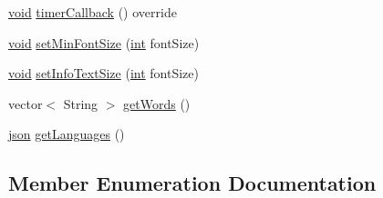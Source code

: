 \begin{DoxyCompactItemize}
\item 
\hyperlink{tk_8h_aba408b7cd755a96426e004c015f5de8e}{void} \hyperlink{class_audealize_1_1_word_map_a397c4fe25b04fc5cdd68032dfb3a07a2}{timer\+Callback} () override
\item 
\hyperlink{tk_8h_aba408b7cd755a96426e004c015f5de8e}{void} \hyperlink{class_audealize_1_1_word_map_aa21c7e96d2e61e77f8360d22b1d3cc0a}{set\+Min\+Font\+Size} (\hyperlink{tk_8h_a83f82f76e7fed06f4c49d2db94028a6d}{int} font\+Size)
\item 
\hyperlink{tk_8h_aba408b7cd755a96426e004c015f5de8e}{void} \hyperlink{class_audealize_1_1_word_map_aaac54963b7da5eb54623597b6585d717}{set\+Info\+Text\+Size} (\hyperlink{tk_8h_a83f82f76e7fed06f4c49d2db94028a6d}{int} font\+Size)
\item 
vector$<$ String $>$ \hyperlink{class_audealize_1_1_word_map_a427952a0caad74987f0c603f54429b9a}{get\+Words} ()
\item 
\hyperlink{_audealize_u_i_8cpp_ab701e3ac61a85b337ec5c1abaad6742d}{json} \hyperlink{class_audealize_1_1_word_map_aef04b861b84bdc82c798d8d0d2ecd8d6}{get\+Languages} ()
\end{DoxyCompactItemize}


\subsection{Member Enumeration Documentation}
